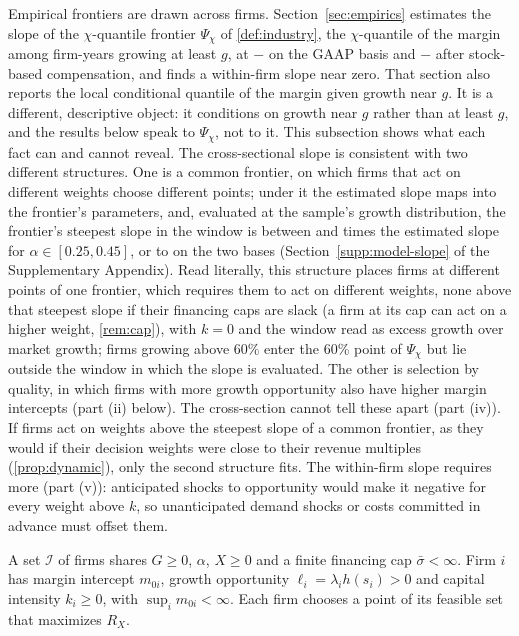 Empirical frontiers are drawn across firms. Section~\ref{sec:empirics} estimates the slope of the $\chi$-quantile frontier $\Psi_\chi$ of \autoref{def:industry}, the $\chi$-quantile of the margin among firm-years growing at least $g$, at $-$\PsiSlopeOp{} on the GAAP basis and $-$\PsiSlopeCash{} after stock-based compensation, and finds a within-firm slope near zero. %
That section also reports the local conditional quantile of the margin given growth near $g$. It is a different, descriptive object: it conditions on growth near $g$ rather than at least $g$, and the results below speak to $\Psi_\chi$, not to it. This subsection shows what each fact can and cannot reveal. The cross-sectional slope is consistent with two different structures. One is a common frontier, on which firms that act on different weights choose different points; under it the estimated slope maps into the frontier's parameters, and, evaluated at the sample's growth distribution, the frontier's steepest slope in the window is between \PsiMultLo{} and \PsiMultHi{} times the estimated slope for $\alpha\in[0.25,0.45]$, or \PsiSteepConeLo{} to \PsiSteepConeHi{} on the two bases (Section~\ref{supp:model-slope} of the Supplementary Appendix). Read literally, this structure places firms at different points of one frontier, which requires them to act on different weights, none above that steepest slope if their financing caps are slack (a firm at its cap can act on a higher weight, \autoref{rem:cap}), with $k=0$ and the window read as excess growth over market growth; firms growing above 60\% enter the 60\% point of $\Psi_\chi$ but lie outside the window in which the slope is evaluated. The other is selection by quality, in which firms with more growth opportunity also have higher margin intercepts (part (ii) below). The cross-section cannot tell these apart (part (iv)). If firms act on weights above the steepest slope of a common frontier, as they would if their decision weights were close to their revenue multiples (\autoref{prop:dynamic}), only the second structure fits. The within-firm slope requires more (part (v)): anticipated shocks to opportunity would make it negative for every weight above $k$, so unanticipated demand shocks or costs committed in advance must offset them.

\begin{assumption}\label{ass:hetero}
A set $\mathcal I$ of firms shares $G\ge 0$, $\alpha$, $X\ge 0$ and a finite financing cap $\bar\sigma<\infty$. Firm $i$ has margin intercept $m_{0i}$, growth opportunity $\ell_i=\lambda_ih(s_i)>0$ and capital intensity $k_i\ge 0$, with $\sup_im_{0i}<\infty$. Each firm chooses a point of its feasible set that maximizes $R_X$.
\end{assumption}

